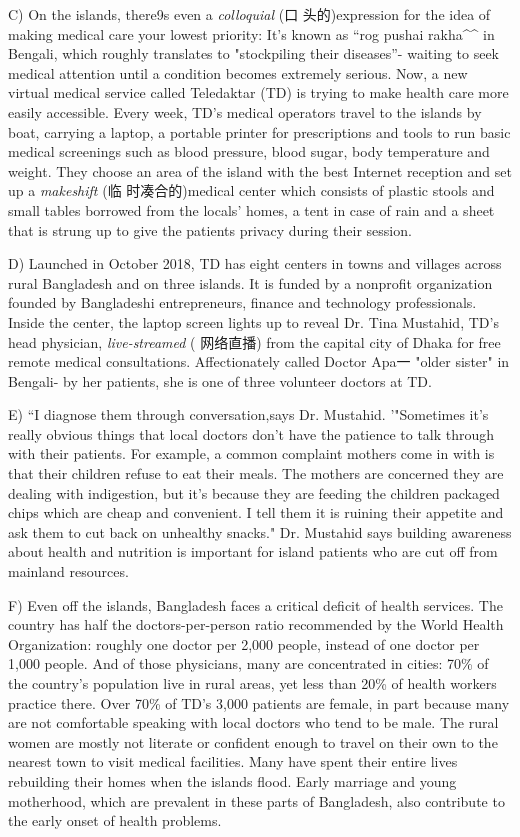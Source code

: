 \documentclass[UTF8,11pt]{ctexart}
\begin{document}
C) On the islands, there9s even a \textit{colloquial} (口 头的)expression for the idea of making medical care your lowest priority: It's known as “rog pushai rakha\textasciicircum{}\textasciicircum{} in Bengali, which roughly translates to "stockpiling their diseases”- waiting to seek medical attention until a condition becomes extremely serious. Now, a new virtual medical service called Teledaktar (TD) is trying to make health care more easily accessible. Every week, TD's medical operators travel to the islands by boat, carrying a laptop, a portable printer for prescriptions and tools to run basic medical screenings such as blood pressure, blood sugar, body temperature and weight. They choose an area of the island with the best Internet reception and set up a \textit{makeshift} (临 时凑合的)medical center which consists of plastic stools and small tables borrowed from the locals' homes, a tent in case of rain and a sheet that is strung up to give the patients privacy during their session.


D) Launched in October 2018, TD has eight centers in towns and villages across rural Bangladesh and on three islands. It is funded by a nonprofit organization founded by Bangladeshi entrepreneurs, finance and technology professionals. Inside the center, the laptop screen lights up to reveal Dr. Tina Mustahid, TD's head physician, \textit{live-streamed} ( 网络直播) from the capital city of Dhaka for free remote medical consultations. Affectionately called Doctor Apa一 "older sister" in Bengali- by her patients, she is one of three volunteer doctors at TD.


E) “I diagnose them through conversation,says Dr. Mustahid. '"Sometimes it's really obvious things that local doctors don't have the patience to talk through with their patients. For example, a common complaint mothers come in with is that their children refuse to eat their meals. The mothers are concerned they are dealing with indigestion, but it's because they are feeding the children packaged chips which are cheap and convenient. I tell them it is ruining their appetite and ask them to cut back on unhealthy snacks." Dr. Mustahid says building awareness about health and nutrition is important for island patients who are cut off from mainland resources.


F) Even off the islands, Bangladesh faces a critical deficit of health services. The country has half the doctors-per-person ratio recommended by the World Health Organization: roughly one doctor per 2,000 people, instead of one doctor per 1,000 people. And of those physicians, many are concentrated in cities: 70\% of the country's population live in rural areas, yet less than 20\% of health workers practice there. Over 70\% of TD's 3,000 patients are female, in part because many are not comfortable speaking with local doctors who tend to be male. The rural women are mostly not literate or confident enough to travel on their own to the nearest town to visit medical facilities. Many have spent their entire lives rebuilding their homes when the islands flood. Early marriage and young motherhood, which are prevalent in these parts of Bangladesh, also contribute to the early onset of health problems.
\end{document}
